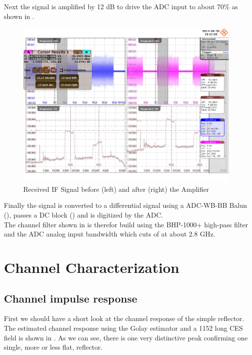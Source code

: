 Next the signal is amplified by 12 dB to drive the \gls{ADC} input to about 70\%
as shown in . \\

\begin{figure}[p]
  \centering
  \includegraphics[width=\textwidth]{figures/osci/res_450_rx_amp}
  \caption{Received \gls{IF} Signal before (left) and after (right) the Amplifier}
  \label{fig:res_450_rx_amp}
\end{figure}

Finally the signal is converted to a differential signal using a ADC-WB-BB Balun
(), passes a \gls{DC} block ()
and is digitized by the \gls{ADC}. \\

The channel filter shown in  is therefor build using
the BHP-1000+ high-pass filter and the \gls{ADC} analog input bandwidth which
cuts of at about 2.8 GHz. \\

\section{Channel Characterization}
\subsection{Channel impulse response}
\label{sec:res_450_h}
First we should have a short look at the channel response of the simple
reflector. The estimated channel response using the Golay estimator and a
1152 long \gls{CES} field is shown in .
As we can see, there is one very distinctive peak confirming one single,
more or less flat, reflector. \\

